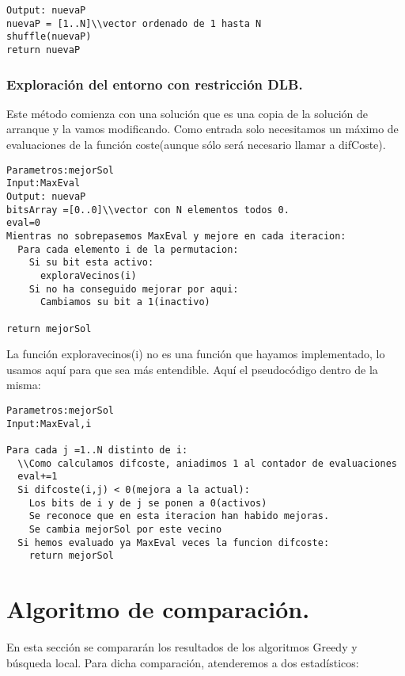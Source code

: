 \begin{lstlisting}
Output: nuevaP
nuevaP = [1..N]\\vector ordenado de 1 hasta N
shuffle(nuevaP)
return nuevaP
\end{lstlisting}


\subsubsection{Exploración del entorno con restricción DLB.}
Este método comienza con una solución que es una copia de la solución de arranque y la vamos modificando. Como entrada solo necesitamos un máximo de evaluaciones de la función coste(aunque sólo será necesario llamar a difCoste). \\

\begin{lstlisting}
Parametros:mejorSol
Input:MaxEval
Output: nuevaP
bitsArray =[0..0]\\vector con N elementos todos 0.
eval=0
Mientras no sobrepasemos MaxEval y mejore en cada iteracion:
  Para cada elemento i de la permutacion:
    Si su bit esta activo:
      exploraVecinos(i)
    Si no ha conseguido mejorar por aqui:
	  Cambiamos su bit a 1(inactivo)
      
return mejorSol
\end{lstlisting}



La función exploravecinos(i) no es una función que hayamos implementado, lo usamos aquí para que sea más entendible. Aquí el pseudocódigo dentro de la misma:\\

\begin{lstlisting}
Parametros:mejorSol
Input:MaxEval,i

Para cada j =1..N distinto de i:
  \\Como calculamos difcoste, aniadimos 1 al contador de evaluaciones
  eval+=1
  Si difcoste(i,j) < 0(mejora a la actual):
    Los bits de i y de j se ponen a 0(activos)
    Se reconoce que en esta iteracion han habido mejoras.
    Se cambia mejorSol por este vecino
  Si hemos evaluado ya MaxEval veces la funcion difcoste:
    return mejorSol
\end{lstlisting}



\newpage

\section{Algoritmo de comparación.}
En esta sección se compararán los resultados de los algoritmos Greedy y búsqueda local. Para dicha comparación, atenderemos a dos estadísticos:\\

